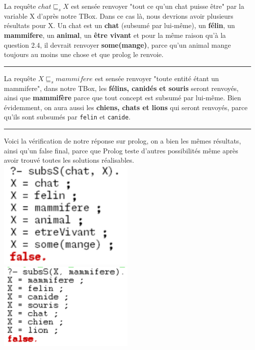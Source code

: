 \documentclass[a4paper,12pt]{report}
\begin{document}
\begin{tcolorbox}[colback=gray!10, colframe=blue!30, coltitle=black, title=Réponse à la question 2.5 - 1/1]

    La requête \(chat \sqsubseteq_s X\) est sensée renvoyer "tout ce qu'un chat puisse être" par la variable X d'après notre TBox. Dans ce cas là, nous devrions avoir plusieurs
        résultats pour X. Un chat est un \textbf{chat} (subsumé par lui-même), un \textbf{félin}, un \textbf{mammifere}, un \textbf{animal}, un \textbf{être vivant} et
        pour la même raison qu'à la question 2.4, il devrait renvoyer \textbf{some(mange)}, parce qu'un animal mange toujours au moins une chose et que prolog le renvoie.\\

    \vspace{0.5cm}
    \hrule
    \vspace{0.5cm}
          
    La requête \(X \sqsubseteq_s mammifere\) est sensée renvoyer "toute entité étant un mammifere", dans notre TBox, les \textbf{félins, canidés et souris} seront renvoyés, ainsi 
        que \textbf{mammifère} parce que tout concept est subsumé par lui-même. Bien évidemment, on aura aussi les \textbf{chiens, chats et lions} qui seront renvoyés, parce qu'ils
        sont subsumés par \texttt{felin} et \texttt{canide}.

    \vspace{0.5cm}
    \hrule
    \vspace{0.5cm}

    Voici la vérification de notre réponse sur prolog, on a bien les mêmes résultats, ainsi qu'un false final, parce que Prolog teste d'autres possibilités même après avoir trouvé
        toutes les solutions réalisables.\\[0.5cm]
    \includegraphics[width=0.5\textwidth]{./images/chat_X.png}
    \includegraphics[width=0.5\textwidth]{./images/X_mammifere.png}

\end{tcolorbox}
\end{document}
